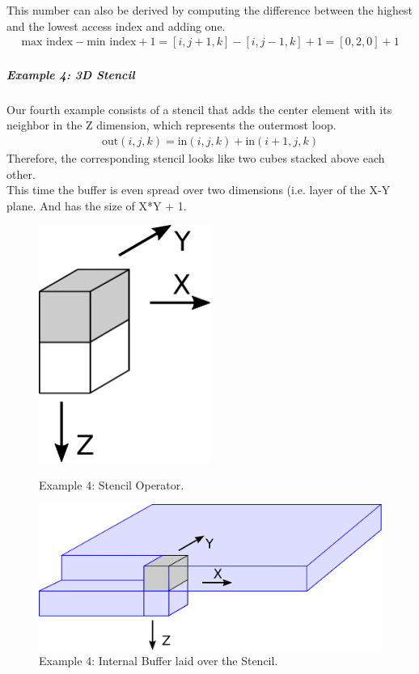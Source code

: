 This number can also be derived by computing the difference between the highest and the lowest access index and adding one. 
\begin{align}
\text{max index} - \text{min index} + 1 = [i, j+1, k] - [i, j-1, k] + 1 = [0, 2, 0] + 1
\end{align}


\subparagraph{Example 4: 3D Stencil}
Our fourth example consists of a stencil that adds the center element with its neighbor in the Z dimension, which represents the outermost loop.
\begin{align}
\text{out}(i, j, k) = \text{in}(i, j, k) + \text{in}(i+1, j, k)
\end{align}
Therefore, the corresponding stencil looks like two cubes stacked above each other. \\
This time the buffer is even spread over two dimensions (i.e. layer of the X-Y plane. And has the size of X*Y + 1. 
\begin{figure}[h]
	\begin{minipage}{.5\columnwidth}
		\centering
		\includegraphics[width=0.5\textwidth]{drawings/buffer-ex4-no-buffer.png}
		\caption{Example 4: Stencil Operator.}
		\label{fig:buffer-ex4-no-buffer}
	\end{minipage}
	\begin{minipage}{.5\columnwidth}
		\centering
		\includegraphics[width=1.0\textwidth]{drawings/buffer-ex4-buffer.png}
		\caption{Example 4: Internal Buffer laid over the Stencil.}
		\label{fig:buffer-ex4-buffer}
	\end{minipage}
\end{figure}

